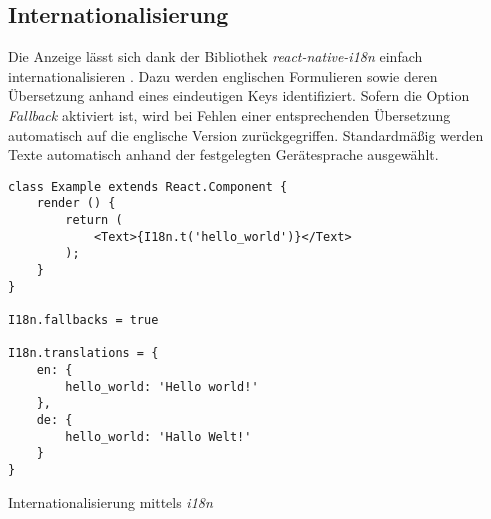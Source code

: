 \subsection{Internationalisierung}
Die Anzeige lässt sich dank der Bibliothek \textit{react-native-i18n} einfach internationalisieren \cite{react-native-i18n_2017}. Dazu werden englischen Formulieren sowie deren Übersetzung anhand eines eindeutigen Keys identifiziert. Sofern die Option \textit{Fallback} aktiviert ist, wird bei Fehlen einer entsprechenden Übersetzung automatisch auf die englische Version zurückgegriffen. Standardmäßig werden Texte automatisch anhand der festgelegten Gerätesprache ausgewählt.

\begin{listing}[H]
    \begin{verbatim}
class Example extends React.Component {
    render () {
        return (
            <Text>{I18n.t('hello_world')}</Text>
        );
    }
}

I18n.fallbacks = true

I18n.translations = {
    en: {
        hello_world: 'Hello world!'
    },
    de: {
        hello_world: 'Hallo Welt!'
    }
}
    \end{verbatim}
    \caption{Internationalisierung mittels \textit{i18n}}
    \label{lst:internationalizing}
\end{listing}



